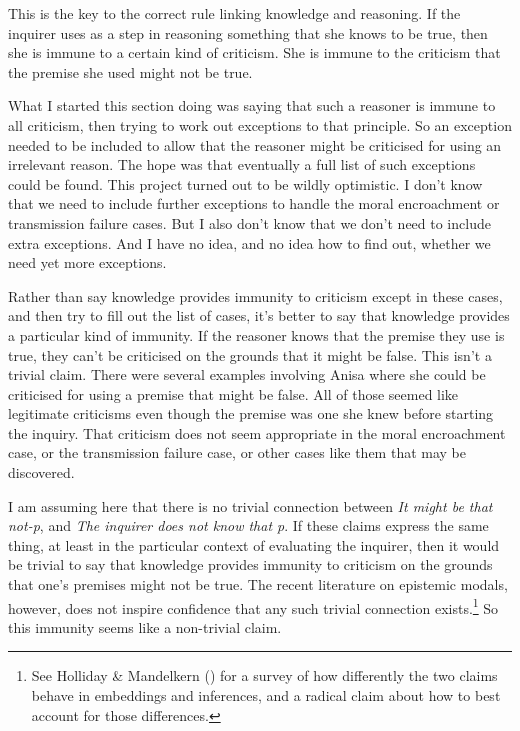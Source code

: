 \documentclass[
  10pt,
  letterpaper,
  twoside]{scrbook}
\begin{document}
This is the key to the correct rule linking knowledge and reasoning. If
the inquirer uses as a step in reasoning something that she knows to be
true, then she is immune to a certain kind of criticism. She is immune
to the criticism that the premise she used might not be true.

What I started this section doing was saying that such a reasoner is
immune to all criticism, then trying to work out exceptions to that
principle. So an exception needed to be included to allow that the
reasoner might be criticised for using an irrelevant reason. The hope
was that eventually a full list of such exceptions could be found. This
project turned out to be wildly optimistic. I don't know that we need to
include further exceptions to handle the moral encroachment or
transmission failure cases. But I also don't know that we don't need to
include extra exceptions. And I have no idea, and no idea how to find
out, whether we need yet more exceptions.

Rather than say knowledge provides immunity to criticism except in these
cases, and then try to fill out the list of cases, it's better to say
that knowledge provides a particular kind of immunity. If the reasoner
knows that the premise they use is true, they can't be criticised on the
grounds that it might be false. This isn't a trivial claim. There were
several examples involving Anisa where she could be criticised for using
a premise that might be false. All of those seemed like legitimate
criticisms even though the premise was one she knew before starting the
inquiry. That criticism does not seem appropriate in the moral
encroachment case, or the transmission failure case, or other cases like
them that may be discovered.

I am assuming here that there is no trivial connection between \emph{It
might be that not-p}, and \emph{The inquirer does not know that p}. If
these claims express the same thing, at least in the particular context
of evaluating the inquirer, then it would be trivial to say that
knowledge provides immunity to criticism on the grounds that one's
premises might not be true. The recent literature on epistemic modals,
however, does not inspire confidence that any such trivial connection
exists.\footnote{See Holliday \& Mandelkern
  () for a survey of how
  differently the two claims behave in embeddings and inferences, and a
  radical claim about how to best account for those differences.} So
this immunity seems like a non-trivial claim.
\end{document}
